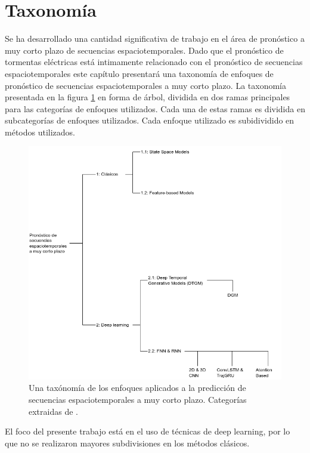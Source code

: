 \section{Taxonomía}

Se ha desarrollado una cantidad significativa de trabajo en el área de 
pronóstico a muy corto plazo de secuencias espaciotemporales. Dado que 
el pronóstico de tormentas eléctricas está intimamente relacionado con el 
pronóstico de secuencias espaciotemporales este capítulo presentará una 
taxonomía de enfoques de pronóstico de secuencias espaciotemporales a muy 
corto plazo.\newline
La taxonomía presentada en la figura \ref{fig:taxonomia} en forma de árbol, 
dividida en dos ramas principales para las categorías de enfoques utilizados. 
Cada una de estas ramas es dividida en subcategorías de enfoques utilizados. 
Cada enfoque utilizado es subidividido en métodos utilizados.

\begin{figure}[H]
  \centering
  \includegraphics[width=14cm]{./E_IMAGENES/3_EstadoArte/taxonomia}
  \caption{
    Una taxónomía de los enfoques aplicados a la predicción de secuencias 
    espaciotemporales a muy corto plazo. Categorías extraidas de 
    \cite{DBLP:journals/corr/abs-1808-06865}.
  }
  \label{fig:taxonomia}
\end{figure}

El foco del presente trabajo está en el uso de técnicas de deep learning, por 
lo que no se realizaron mayores subdivisiones en los métodos clásicos.

